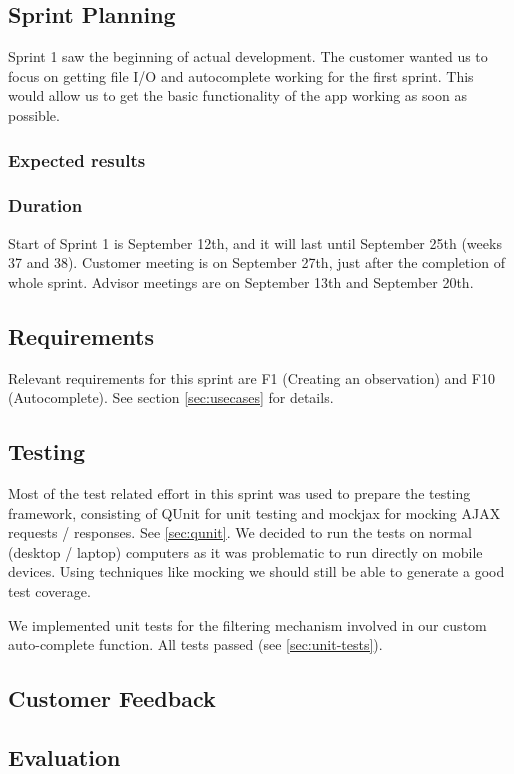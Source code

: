 \subsection{Sprint Planning}

	Sprint 1 saw the beginning of actual development. The customer wanted us to focus on getting file I/O and autocomplete working for the first sprint. This would allow us to get the basic functionality of the app working as soon as possible.

	\subsubsection{Expected results}
	
	\subsubsection{Duration}
	Start of Sprint 1 is September 12th, and it will last until September 25th (weeks 37 and 38). Customer meeting is on September 27th, just after the completion of whole sprint. Advisor meetings are on September 13th and September 20th.
	
\subsection{Requirements}

	Relevant requirements for this sprint are F1 (Creating an observation) and F10 (Autocomplete). See section \ref{sec:usecases} for details.


\subsection{Testing}

	Most of the test related effort in this sprint was used to prepare the
	testing framework, consisting of QUnit for unit testing and mockjax for
	mocking AJAX requests / responses. See \ref{sec:qunit}. We decided to run
	the tests on normal (desktop / laptop) computers as it was problematic to
	run directly on mobile devices. Using techniques like mocking we should
	still be able to generate a good test coverage.

	We implemented unit tests for the filtering mechanism involved in our custom
	auto-complete function. All tests passed (see \ref{sec:unit-tests}).

\subsection{Customer Feedback}

\subsection{Evaluation}
